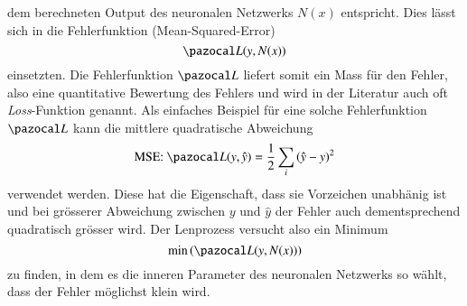 dem berechneten Output des neuronalen Netzwerks $N(x)$ entspricht. Dies lässt sich in die Fehlerfunktion (Mean-Squared-Error)
\begin{equation}
\Lb(y,N(x))
\label{ableitung:eqn:loss_net}
\end{equation}
einsetzten.
Die Fehlerfunktion $\Lb$ liefert somit ein Mass für den Fehler, also eine quantitative Bewertung des Fehlers und wird in der Literatur auch oft \textit{Loss}-Funktion genannt. Als einfaches Beispiel für eine solche Fehlerfunktion $\Lb$ kann die mittlere quadratische Abweichung 
\begin{equation}
\text{MSE: } \Lb (y, \hat{y}) = \frac{1}{2} \sum_i \left( \hat{y} - y \right)^2
\label{ableitung:eqn:loss}
\end{equation}
verwendet werden. Diese hat die Eigenschaft, dass sie Vorzeichen unabhänig ist und bei grösserer Abweichung zwischen $y$ und $\hat{y}$ der Fehler auch dementsprechend quadratisch grösser wird.
Der Lenprozess versucht also ein Minimum 
\begin{equation}
	\min \left( \Lb(y,N(x)) \right) 
	\label{ableitung:eqn:min_loss}
\end{equation}
zu finden, in dem es die inneren Parameter des neuronalen Netzwerks so wählt, dass der Fehler möglichst klein wird.
